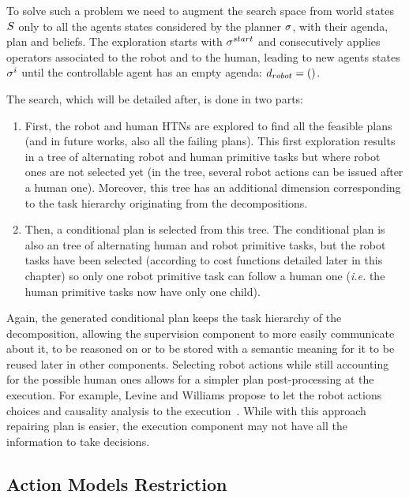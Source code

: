 \documentclass[a4paper,11pt,twoside]{StyleThese}
\begin{document}
To solve such a problem we need to augment the search space from world states $S$ only to all the agents states considered by the planner $\sigma$, with their agenda, plan and beliefs. The exploration starts with $\sigma^{start}$ and consecutively applies operators associated to the robot and to the human, leading to new agents states $\sigma^{i}$ until the controllable agent has an empty agenda: $d_{robot} = ()$.

The search, which will be detailed after, is done in two parts:
\begin{enumerate}
\item First, the robot and human HTNs are explored to find all the feasible plans (and in future works, also all the failing plans). This first exploration results in a tree of alternating robot and human primitive tasks but where robot ones are not selected yet (in the tree, several robot actions can be issued after a human one). Moreover, this tree has an additional dimension corresponding to the task hierarchy originating from the  decompositions.

\item  Then, a conditional plan is selected from this tree. The conditional plan is also an tree of alternating human and robot primitive tasks, but the robot tasks have been selected (according to cost functions detailed later in this chapter) so only one robot primitive task can follow a human one (\textit{i.e.} the human primitive tasks now have only one child).
\end{enumerate}

Again, the generated conditional plan keeps the task hierarchy of the  decomposition, allowing the supervision component to more easily communicate about it, to be reasoned on or to be stored with a semantic meaning for it to be reused later in other components. Selecting robot actions while still accounting for the possible human ones allows for a simpler plan post-processing at the execution. For example, Levine and Williams propose to let the robot actions choices and causality analysis to the execution~\cite{levine2014concurrent}. While with this approach repairing plan is easier, the execution component may not have all the information to take decisions.

\subsection{Action Models Restriction}
\end{document}
